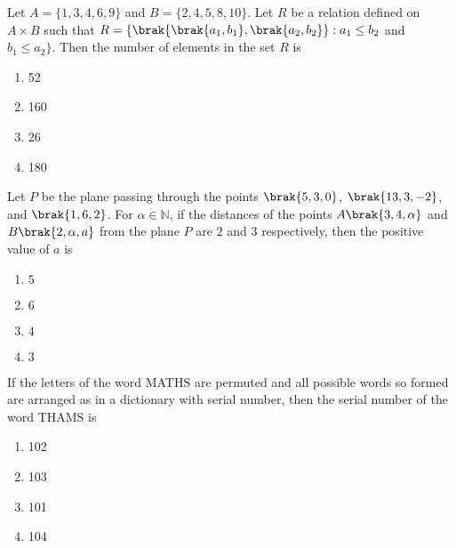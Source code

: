 \item Let $A = \{1, 3, 4, 6, 9\}$ and $B = \{2, 4, 5, 8, 10\}$. Let $R$ be a relation defined on $A \times B$ such that $R = \{\brak{\brak{a_1, b_1}, \brak{a_2, b_2}}: a_1 \leq b_2$ and $b_1 \leq a_2\}.$ Then the number of elements in the set $R$ is \hfill {}
\begin{multicols}{4}
\begin{enumerate}
    \item 52 
    \item 160 
    \item 26 
    \item 180 
\end{enumerate}
\end{multicols}



\item Let $P$ be the plane passing through the points $\brak{5, 3, 0}$, $\brak{13, 3, -2}$, and $\brak{1, 6, 2}$. For $\alpha \in \mathbb{N}$, if the distances of the points $A\brak{3, 4, \alpha}$ and $B\brak{2, \alpha, a}$ from the plane $P$ are $2$ and $3$ respectively, then the positive value of $a$ is \hfill {}
\begin{multicols}{4}
\begin{enumerate}
    \item $5$
    \item $6$
    \item $4$
    \item $3$
\end{enumerate}
\end{multicols}


\item If the letters of the word MATHS are permuted and all possible words so formed are arranged as in a dictionary with serial number, then the serial number of the word THAMS is  \hfill {}
\begin{multicols}{4}
\begin{enumerate}
    \item 102 
    \item 103 
    \item 101 
    \item 104 
\end{enumerate}
\end{multicols}

